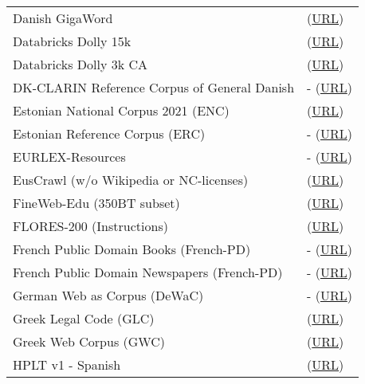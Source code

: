 \begin{longtable}{p{} | p{}}
    Danish GigaWord & \citet{stromberg-derczynski_danish_2021} (\href{https://sprogteknologi.dk/dataset/danish-gigaword}{URL}) \\ 
    Databricks Dolly 15k & \citet{conover_dolly_2023} (\href{https://huggingface.co/datasets/databricks/databricks-dolly-15k}{URL}) \\ 
    Databricks Dolly 3k CA & \citet{conover_dolly_2023} (\href{https://huggingface.co/datasets/projecte-aina/dolly3k_ca}{URL}) \\ 
    DK-CLARIN Reference Corpus of General Danish & - (\href{https://korpus.dsl.dk/clarin/}{URL}) \\ 
    Estonian National Corpus 2021 (ENC) & \citet{koppel_eesti_2022} (\href{https://metashare.ut.ee/repository/browse/estonian-national-corpus-2021-vert/4547c7bea0d411eebb4773db10791bcfd961b8c70b544966800142b04f957a86/}{URL}) \\ 
    Estonian Reference Corpus (ERC) & - (\href{https://www.cl.ut.ee/korpused/segakorpus/}{URL}) \\ 
    EURLEX-Resources & - (\href{https://huggingface.co/datasets/joelniklaus/eURLex\_resources}{URL}) \\ 
    EusCrawl (w/o Wikipedia or NC-licenses) & \citet{artetxe_does_2022} (\href{https://huggingface.co/datasets/HiTZ/euscrawl}{URL}) \\ 
    FineWeb-Edu (350BT subset) & \citet{penedo_fineweb_2024} (\href{https://huggingface.co/datasets/HuggingFaceFW/fineweb-edu}{URL}) \\ 
    FLORES-200 (Instructions) & \citet{nllb_language_2022} (\href{https://huggingface.co/datasets/facebook/flores}{URL}) \\ 
    French Public Domain Books (French-PD) & - (\href{https://huggingface.co/datasets/PleIAs/French-PD-Books}{URL}) \\ 
    French Public Domain Newspapers (French-PD) & - (\href{https://huggingface.co/datasets/PleIAs/French-PD-Newspapers}{URL}) \\ 
    German Web as Corpus (DeWaC) & - (\href{https://docs.sslmit.unibo.it/doku.php?id=corpora:dewac}{URL}) \\ 
    Greek Legal Code (GLC) & \citet{papaloukas_multi-granular_2021} (\href{https://huggingface.co/datasets/greek\_legal\_code}{URL}) \\ 
    Greek Web Corpus (GWC) & \citet{outsios_word_2018} (\href{http://nlp.polytechnique.fr/resources-greek}{URL}) \\ 
    HPLT v1 - Spanish & \citet{de_gibert_new_2024} (\href{https://hplt-project.org/datasets/v1}{URL}) \\ 

\end{longtable}
